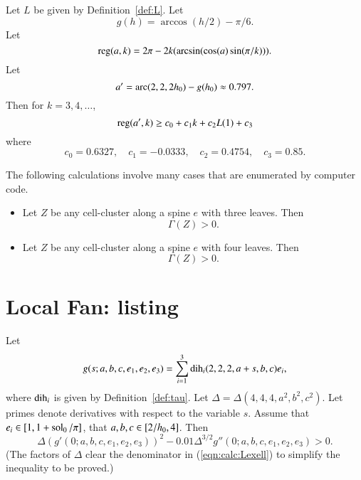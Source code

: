 \begin{calculation}\label{calc:cc:alin2}
Let $L$ be given by Definition~\ref{def:L}.
Let
\begin{displaymath}
g(h) = \arccos(h/2) - \pi/6.
\end{displaymath}
Let
\begin{displaymath}
{\operatorname{reg}}(a,k) = 2\pi - 2 k (\arcsin(\cos(a)\sin(\pi/k))).
\end{displaymath}
Let
\begin{displaymath}a'=\operatorname{arc}(2,2,2{h_0})-g({h_0}) \approx
0.797.\end{displaymath} Then for $k=3,4,\ldots$,
\begin{displaymath}{\operatorname{reg}}(a',k) \ge c_0 + c_1 k + c_2 L(1) +
c_3\end{displaymath}
where 
\begin{displaymath}c_0 = 0.6327,\quad c_1 = -0.0333,\quad c_2 =
0.4754,\quad c_3 = 0.85.\end{displaymath}
\end{calculation}

\begin{calculation}\label{calc:shorts}
The following calculations involve many cases that are enumerated by
computer code.
\begin{itemize}
\item {} Let $Z$ be any cell-cluster along a spine $e$
with three leaves.  Then
\begin{displaymath}
\Gamma(Z)> 0.
\end{displaymath}
\item {} Let $Z$ be any cell-cluster along a spine $e$
with four leaves.  Then
\begin{displaymath}
\Gamma(Z)> 0.
\end{displaymath}
\end{itemize}
\end{calculation}




\section{Local Fan: listing}

\begin{calculation}\label{calc:Lexell}
Let
\begin{displaymath}
g(s;a,b,c,e_1,e_2,e_3) = \sum_{i=1}^3 \operatorname{dih}_i(2,2,2,a+s,b,c) e_i,
\end{displaymath}
where $\operatorname{dih}_i$ is given by Definition~\ref{def:tau}.
Let $\Delta = \Delta(4,4,4,a^2,b^2,c^2)$.
Let primes denote derivatives with respect to the variable $s$.
Assume that
$e_i\in[1,1+\operatorname{sol}_0/\pi]$,  that
$a,b,c\in[2/{h_0},4]$.
Then
\begin{equation}\label{eqn:calc:Lexell}
  \Delta (g'(0;a,b,c,e_1,e_2,e_3))^2 
- 0.01\Delta^{3/2}g''(0;a,b,c,e_1,e_2,e_3) > 0.
\end{equation}
(The factors of $\Delta$ clear the denominator in
(\ref{eqn:calc:Lexell}) to simplify the inequality to be proved.)
\end{calculation}

